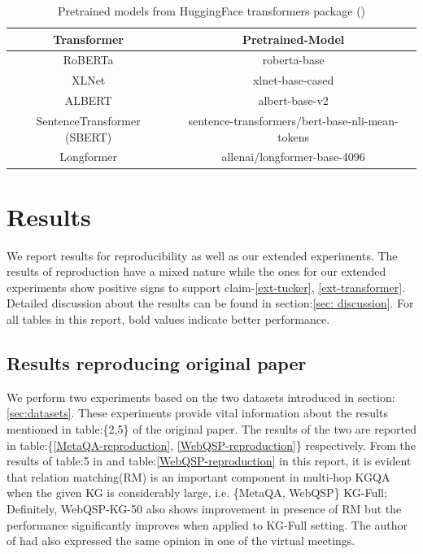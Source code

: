\begin{table}[]
\centering
\begin{tabular}{c|c}
\hline
\textbf{Transformer}        & \textbf{Pretrained-Model}                       \\ \hline
RoBERTa                     & roberta-base                                    \\ \hline
XLNet                       & xlnet-base-cased                                \\ \hline
ALBERT                      & albert-base-v2                                  \\ \hline
SentenceTransformer (SBERT) & sentence-transformers/bert-base-nli-mean-tokens \\ \hline
Longformer                  & allenai/longformer-base-4096                    \\ \hline
\end{tabular}
\caption{Pretrained models from HuggingFace transformers package (\citep{huggingface-transformers-package-2020})}
\label{que-emd-pretrained-models}
\end{table}

\section{Results}
\label{sec:results}
We report results for reproducibility as well as our extended experiments. The results of reproduction have a mixed nature while the ones for our extended experiments show positive signs to support claim-\ref{ext-tucker}, \ref{ext-transformer}. Detailed discussion about the results can be found in section:\ref{sec: discussion}. For all tables in this report, bold values indicate better performance.

\subsection{Results reproducing original paper}\label{sec: reproduction_results}
We perform two experiments based on the two datasets introduced in section:\ref{sec:datasets}. These experiments provide vital information about the results mentioned in table:\{2,5\} of the original paper. The results of the two are reported in table:\{\ref{MetaQA-reproduction}, \ref{WebQSP-reproduction}\} respectively. From the results of table:5 in \citep{saxena-etal-2020-improving} and table:\ref{WebQSP-reproduction} in this report, it is evident that relation matching(RM) is an important component in multi-hop KGQA when the given KG is considerably large, i.e. \{MetaQA, WebQSP\} KG-Full; Definitely, WebQSP-KG-50 also shows improvement in presence of RM but the performance significantly improves when applied to KG-Full setting. The author of \citep{saxena-etal-2020-improving} had also expressed the same opinion in one of the virtual meetings.

